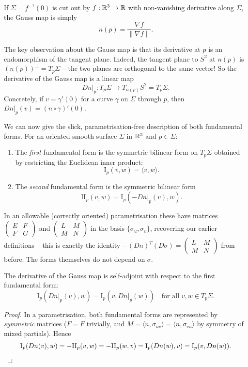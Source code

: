 \documentclass[a4paper]{scrartcl}
\begin{document}
\begin{remark}
    If $\Sigma = f^{-1}(0)$ is cut out by $f: \mathbb{R}^3 \rightarrow \mathbb{R}$ with non-vanishing derivative along $\Sigma$, the Gauss map is simply
    $$
    n(p) = \frac{\nabla f}{\|\nabla f\|}.
    $$
\end{remark}

The key observation about the Gauss map is that its derivative at $p$ is an endomorphism of the tangent plane. Indeed, the tangent plane to $S^2$ at $n(p)$ is $(n(p))^\perp = T_p\Sigma$ -- the two planes are orthogonal to the same vector! So the derivative of the Gauss map is a linear map
$$
\left.Dn\right|_p : T_p \Sigma \rightarrow T_{n(p)} S^2 = T_p \Sigma.
$$
Concretely, if $v = \gamma'(0)$ for a curve $\gamma$ on $\Sigma$ through $p$, then $\left.Dn\right|_p(v) = (n \circ \gamma)'(0)$.

We can now give the slick, parametrisation-free description of both fundamental forms. For an oriented smooth surface $\Sigma$ in $\mathbb{R}^3$ and $p \in \Sigma$:
\begin{enumerate}[label=(\roman*)]
    \item The \emph{first} fundamental form is the symmetric bilinear form on $T_p\Sigma$ obtained by restricting the Euclidean inner product:
    $$
    \mathrm{I}_p(v, w) = \langle v, w \rangle.
    $$
    \item The \emph{second} fundamental form is the symmetric bilinear form
    $$
    \mathrm{II}_p (v, w) = \mathrm{I}_p\left(-\left.Dn\right|_p(v), w\right).
    $$
\end{enumerate}
In an allowable (correctly oriented) parametrisation these have matrices $\begin{pmatrix} E & F \\ F & G\end{pmatrix}$ and $\begin{pmatrix} L & M \\ M & N \end{pmatrix}$ in the basis $\{\sigma_u, \sigma_v\}$, recovering our earlier definitions -- this is exactly the identity $-(Dn)^T(D\sigma) = \begin{pmatrix} L & M \\ M & N\end{pmatrix}$ from before. The forms themselves do not depend on $\sigma$.

\begin{lemma}
    The derivative of the Gauss map is self-adjoint with respect to the first fundamental form:
    $$
    \mathrm{I}_p\left(\left.Dn\right|_p(v), w\right) = \mathrm{I}_p\left(v, \left.Dn\right|_p(w)\right) \quad \text{for all } v, w \in T_p\Sigma.
    $$
\end{lemma}
\begin{proof}
    In a parametrisation, both fundamental forms are represented by \emph{symmetric} matrices ($F = F$ trivially, and $M = \langle n, \sigma_{uv}\rangle = \langle n, \sigma_{vu} \rangle$ by symmetry of mixed partials). Hence
    $$
    \mathrm{I}_p(Dn(v), w) = -\mathrm{II}_p(v, w) = -\mathrm{II}_p(w, v) = \mathrm{I}_p(Dn(w), v) = \mathrm{I}_p(v, Dn(w)). \qedhere
    $$
\end{proof}
\end{document}
